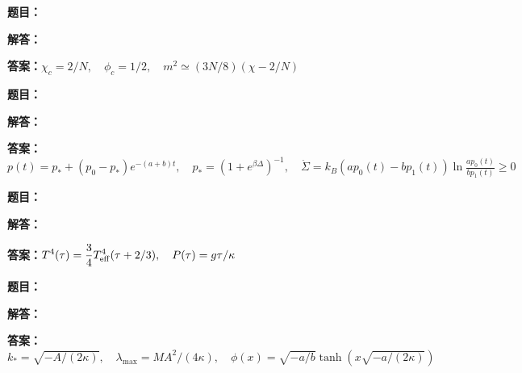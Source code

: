 \documentclass[lang=cn,color=blue,11pt]{elegantbook}
\begin{document}
\par\smallskip\noindent\hrulefill\par\medskip
{}\par
\noindent\textbf{题目：}
\par\noindent\textbf{解答：}
\par\noindent\textbf{答案：}\(\displaystyle \chi_c=2/N,\quad\phi_c=1/2,\quad m^2\simeq(3N/8)(\chi-2/N)\)\par
\par\smallskip\noindent\hrulefill\par\medskip
{}\par
\noindent\textbf{题目：}
\par\noindent\textbf{解答：}
\par\noindent\textbf{答案：}\(\displaystyle p(t)=p_*+(p_0-p_*)e^{-(a+b)t},\quad p_*=(1+e^{\beta\Delta})^{-1},\quad \dot\Sigma=k_B(ap_0(t)-bp_1(t))\ln\frac{ap_0(t)}{bp_1(t)}\ge0\)\par
\par\smallskip\noindent\hrulefill\par\medskip
{}\par
\noindent\textbf{题目：}
\par\noindent\textbf{解答：}
\par\noindent\textbf{答案：}\(\displaystyle T^4(\tau)=\frac34T_{\rm eff}^4(\tau+2/3),\quad P(\tau)=g\tau/\kappa\)\par
\par\smallskip\noindent\hrulefill\par\medskip
{}\par
\noindent\textbf{题目：}
\par\noindent\textbf{解答：}
\par\noindent\textbf{答案：}\(\displaystyle k_*=\sqrt{-A/(2\kappa)},\quad\lambda_{\max}=MA^2/(4\kappa),\quad\phi(x)=\sqrt{-a/b}\tanh\!\left(x\sqrt{-a/(2\kappa)}\right)\)\par
\end{document}
